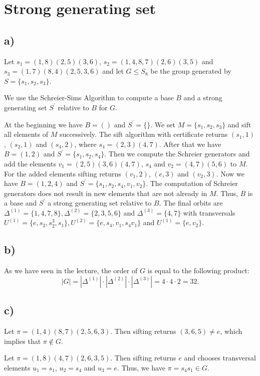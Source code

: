 \section{Strong generating set}
\subsection*{a)}
Let $s_1 = (1,8)(2,5)(3,6)$, $s_2 = (1,4,8,7)(2,6)(3,5)$ and $s_3 = (1,7)(8,4)(2,5,3,6)$ and let $G \leq S_8$ be the group generated by $S = \{s_1,s_2,s_3\}$.

We use the Schreier-Sims Algorithm to compute a base $B$ and a strong generating set $S^\prime$ relative to $B$ for $G$.

At the beginning we have $B = ()$ and $S^\prime = \{\}$. We set $M = \{s_1, s_2, s_3\}$ and sift all elements of $M$ successively. The sift algorithm with certificate returns $(s_1,1)$, $(s_2,1)$ and $(s_4,2)$, where $s_4 = (2,3)(4,7)$. After that we have $B = (1,2)$ and $S^\prime = \{s_1,s_2,s_4\}$. Then we compute the Schreier generators and add the elements $v_1 = (2,5)(3,6)(4,7)$, $s_4$ and $v_2 = (4,7)(5,6)$ to $M$. For the added elements sifting returns $(v_1,2)$, $(e,3)$ and $(v_2,3)$. Now we have $B = (1,2,4)$ and $S^\prime = \{s_1,s_2,s_4,v_1,v_2\}$. The computation of Schreier generators does not result in new elements that are not already in $M$. Thus, $B$ is a base and $S^\prime$ a strong generating set relative to $B$. The final orbits are $\Delta^{(1)} = \{1,4,7,8\}, \Delta^{(2)} = \{2,3,5,6\}$ and $\Delta^{(3)} = \{4,7\}$ with transversals $U^{(1)} = \{e, s_2, s_2^3, s_1\}, U^{(2)} = \{e, s_4, v_1, s_4 v_1\}$ and $U^{(1)} = \{e, v_2\}$.

\subsection*{b)}
As we have seen in the lecture, the order of $G$ is equal to the following product:
\[ |G| = |\Delta^{(1)}| \cdot |\Delta^{(2)}| \cdot |\Delta^{(3)}| = 4 \cdot 4 \cdot 2 = 32. \]

\subsection*{c)}
Let $\pi = (1,4)(8,7)(2,5,6,3)$. Then sifting returns $(3,6,5) \neq e$, which implies that $\pi \notin G$.

Let $\pi = (1,8)(4,7)(2,6,3,5)$. Then sifting returns $e$ and chooses transversal elements $u_1 = s_1$, $u_2 = s_4$ and $u_3 = e$. Thus, we have $\pi = s_4 s_1 \in G$.

